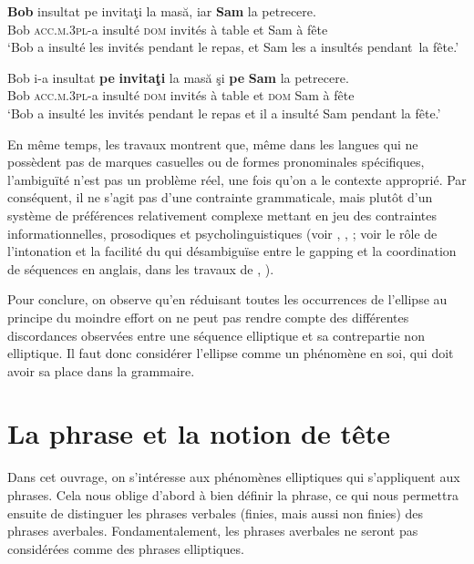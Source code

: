 \ea
\ea
\gll  \textbf{Bob}   insultat pe invitaţi la  masă,  iar  \textbf{Sam}  la  petrecere. \label{ch1:ex20a} \\
Bob  \textsc{acc.m.3pl}{}-a  insulté  \textsc{dom}  invités  à  table  et  Sam  à  fête\\
\glt ‘Bob a insulté les invités pendant le repas, et Sam les a insultés pendant~la fête.’ 

\ex
\gll Bob  i-a  insultat  \textbf{pe}  \textbf{invitaţi}  la  masă  şi  \textbf{pe}  \textbf{Sam}  la  petrecere.\label{ch1:ex20b}\\
Bob  \textsc{acc.m.3pl}{}-a  insulté  \textsc{dom}  invités  à  table  et  \textsc{dom}  Sam  à  fête\\
\glt ‘Bob a insulté les invités pendant le repas et il a insulté Sam pendant la fête.’ 
\z
\z

En même temps, les travaux montrent que, même dans les langues qui ne possèdent pas de marques casuelles ou de formes pronominales spécifiques, l’ambi\-guïté n’est pas un problème réel, une fois qu’on a le contexte approprié. Par conséquent, il ne s’agit pas d’une contrainte grammaticale, mais plutôt d’un système de préférences relativement complexe mettant en jeu des contraintes informationnelles, prosodiques et psycholinguistiques (voir \citealt{Hankamer1973}, \citealt{Kuno1976}, \citealt{Carlson2002} ; voir le rôle de l’intonation et la facilité du  qui désam\-biguïse entre le gapping et la coordination de séquences en anglais, dans les travaux de \citealt{Carlson2001}, \citealt{Carlson2002}).

Pour conclure, on observe qu’en réduisant toutes les occurrences de l’ellipse au principe du moindre effort on ne peut pas rendre compte des différentes discordances observées entre une séquence elliptique et sa contrepartie non elliptique. Il faut donc considérer l’ellipse comme un phénomène en soi, qui doit avoir sa place dans la grammaire.


\section{La phrase et la notion de tête} \label{ch1:sect1.3}

Dans cet ouvrage, on s’intéresse aux phénomènes elliptiques qui s’appliquent aux phrases. Cela nous oblige d’abord à bien définir la phrase, ce qui nous permettra ensuite de distinguer les phrases verbales (finies, mais aussi non finies) des phrases averbales. Fondamentalement, les phrases averbales ne seront pas considérées comme des phrases elliptiques.


